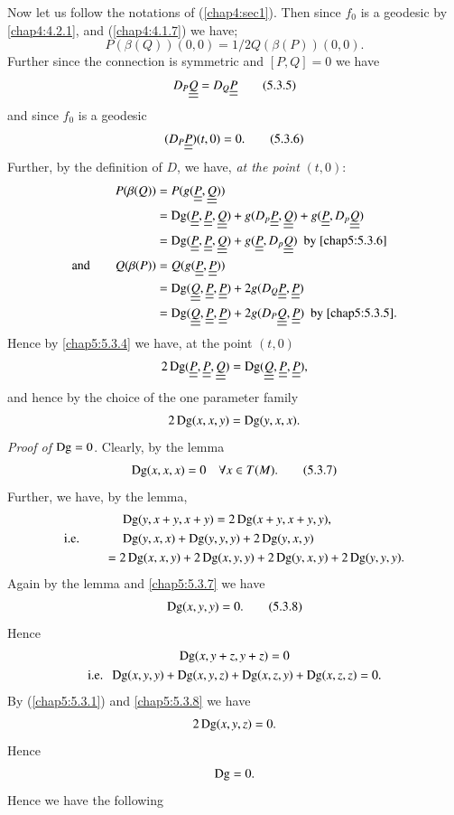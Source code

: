 Now let us follow the notations of (\ref{chap4:sec1}). Then since $f_{0}$ is
a geodesic by \eqref{chap4:4.2.1}, and (\ref{chap4:4.1.7}) we have; 
\begin{equation*}
P(\beta(Q))(0,0)=1/2Q(\beta(P))(0,0).\tag{5.3.4}\label{chap5:5.3.4}
\end{equation*}
Further \pageoriginale since the connection is symmetric and $[P,Q]=0$
we have
\begin{equation*}
D_{P}\underline{\underline{Q}}=D_{Q}\underline{\underline{P}}\tag{5.3.5}\label{chap5:5.3.5}
\end{equation*}
and since $f_{0}$ is a geodesic
\begin{equation*}
(D_{P}\underline{\underline{P}})(t,0)=0.\tag{5.3.6}\label{chap5:5.3.6}
\end{equation*}
Further, by the definition of $D$, we have, {\em at the point}
$(t,0)$:
\begin{align*}
P(\beta(Q)) &= P(g(\underline{\underline{P}},\underline{\underline{Q}}))\\
            &=
\operatorname{Dg}(\underline{\underline{P}},\underline{\underline{P}},\underline{\underline{Q}})+g(D_{p}\underline{\underline{P}},\underline{\underline{Q}})+g(\underline{\underline{P}},D_{p}\underline{\underline{Q}})\\ 
            &= \operatorname{Dg}
(\underline{\underline{P}},\underline{\underline{P}},\underline{\underline{Q}})+g(\underline{\underline{P}},D_{p}\underline{\underline{Q}})\text{ \  by
  \eqref{chap5:5.3.6}}\\
\text{and}\qquad Q(\beta(P)) &= Q(g(\underline{\underline{P}},\underline{\underline{P}}))\\
            &= \operatorname{Dg}(\underline{\underline{Q}},\underline{\underline{P}},\underline{\underline{P}})+2g(D_{Q}\underline{\underline{P}},\underline{\underline{P}})\\
            &=
\operatorname{Dg}(\underline{\underline{Q}},\underline{\underline{P}},\underline{\underline{P}})+2g(D_{P}\underline{\underline{Q}},\underline{\underline{P}})\text{ \ by \eqref{chap5:5.3.5}.}
\end{align*}
Hence by \eqref{chap5:5.3.4} we have, at the point $(t,0)$
$$
2\operatorname{Dg}(\underline{\underline{P}},\underline{\underline{P}},\underline{\underline{Q}})=\operatorname{Dg}(\underline{\underline{Q}},\underline{\underline{P}},\underline{\underline{P}}),
$$
and hence by the choice of the one parameter family
$$
2 \operatorname{Dg}(x,x,y)=\operatorname{Dg}(y,x,x).
$$
{\em Proof of $\operatorname{Dg}=0$}. Clearly, by the lemma
\begin{equation*}
\operatorname{Dg}(x,x,x)=0\quad \forall x\in T(M).\tag{5.3.7}\label{chap5:5.3.7}
\end{equation*}
Further, we have, by the lemma,
\begin{align*}
&\quad\; \operatorname{Dg}(y,x+y,x+y)=2\operatorname{Dg}(x+y,x+y,y),\\
\text{i.e.}\qquad &\quad\; \operatorname{Dg}(y,x,x)+\operatorname{Dg}(y,y,y)+2\operatorname{Dg}(y,x,y)\\
&= 2\operatorname{Dg}(x,x,y)+2\operatorname{Dg}(x,y,y)+2\operatorname{Dg}(y,x,y)+2\operatorname{Dg}(y,y,y).
\end{align*}
Again by the lemma and \eqref{chap5:5.3.7} we have
\begin{equation*}
\operatorname{Dg}(x,y,y)=0.\tag{5.3.8}\label{chap5:5.3.8}
\end{equation*}\pageoriginale
Hence
\begin{gather*}
\operatorname{Dg}(x,y+z,y+z)=0\\
\text{i.e. \ } \operatorname{Dg}(x,y,y)+\operatorname{Dg}(x,y,z)+\operatorname{Dg}(x,z,y)+\operatorname{Dg}(x,z,z)=0.
\end{gather*}
By (\ref{chap5:5.3.1}) and \eqref{chap5:5.3.8} we have
$$
2\operatorname{Dg}(x,y,z)=0.
$$
Hence
$$
\operatorname{Dg}=0.
$$
Hence we have the following

